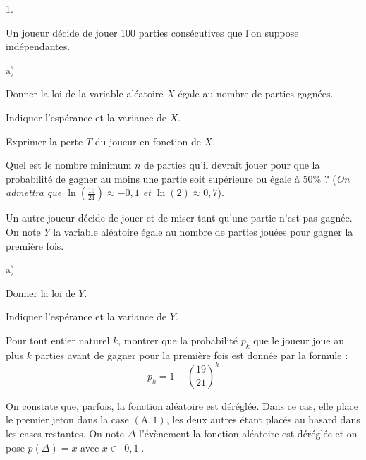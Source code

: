 \documentclass[11pt]{article}%
\begin{document}
{\vp\vpp
{}

\begin{noliste}{1.}
 \setlength{\itemsep}{4mm}
\item Un joueur décide de jouer 100 parties consécutives que l'on
suppose indépendantes.
\begin{noliste}{a)}
 \setlength{\itemsep}{2mm}
\item Donner la loi de la variable aléatoire $X$ égale au nombre de
parties gagnées.

\item Indiquer l'espérance et la variance de $X$.

\item Exprimer la perte $T$ du joueur en fonction de $X$.
\end{noliste} 

\item Quel est le nombre minimum $n$ de parties qu'il devrait jouer
pour que la probabilité de gagner au moins une partie soit supérieure
ou égale à 50\% ? ({\it On admettra que
$\ln\!\left(\frac{19}{21}\right)\approx-0,1$ et $\ln(2)\approx0,7$}).

\item Un autre joueur décide de jouer et de miser tant qu'une partie
n'est pas gagnée. On note $Y$ la variable aléatoire égale au nombre de
parties jouées pour gagner la première fois.
\begin{noliste}{a)}
 \setlength{\itemsep}{2mm}
\item Donner la loi de $Y$.

\item Indiquer l'espérance et la variance de $Y$.

\item Pour tout entier naturel $k$, montrer que la probabilité $p_{k}$
que le joueur joue au plus $k$ parties avant de gagner pour la première
fois
est donnée par la formule :
\[
p_{k} = 1-\left(\frac{19}{21}\right)^{k}
\]
\end{noliste} 
\end{noliste} 


\vp\vpp
{}

\vp\vpp
\begin{minipage}{.965\textwidth}
\noindent On constate que, parfois, la fonction aléatoire est déréglée.
Dans ce cas, elle place le premier jeton dans la case $(\textrm{A},1)$,
les deux autres étant placés au hasard dans les cases restantes. On
note $\Delta$ l'évènement \og la fonction aléatoire est déréglée \fg
\;et on pose $p(\Delta) = x$ avec $x\in\,]0,1[$.
\end{minipage}

}
\end{document}
